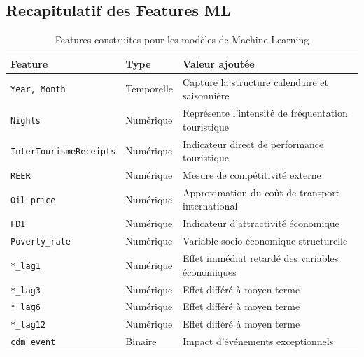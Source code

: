 \documentclass[12pt,a4paper]{report}
\begin{document}
\begin{itemize}[leftmargin=1.5em]
\subsection{Recapitulatif des Features ML}


\begin{table}[H]
\centering
\small
\renewcommand{\arraystretch}{1.4}
\begin{tabular}{p{4.2cm}p{2.8cm}p{6cm}}
\toprule
\textbf{Feature} & \textbf{Type} & \textbf{Valeur ajoutée} \\
\midrule

\texttt{Year, Month} 
& Temporelle 
& Capture la structure calendaire et saisonnière \\

\texttt{Nights} 
& Numérique 
& Représente l’intensité de fréquentation touristique \\

\texttt{InterTourismeReceipts} 
& Numérique 
& Indicateur direct de performance touristique \\

\texttt{REER} 
& Numérique 
& Mesure de compétitivité externe \\

\texttt{Oil\_price} 
& Numérique 
& Approximation du coût de transport international \\

\texttt{FDI} 
& Numérique 
& Indicateur d’attractivité économique \\

\texttt{Poverty\_rate} 
& Numérique 
& Variable socio-économique structurelle \\


\texttt{*\_lag1} 
& Numérique 
& Effet immédiat retardé des variables économiques \\

\texttt{*\_lag3} 
& Numérique 
& Effet différé à moyen terme \\

\texttt{*\_lag6} 
& Numérique 
& Effet différé à moyen terme \\

\texttt{*\_lag12} 
& Numérique 
& Effet différé à moyen terme \\

\texttt{cdm\_event} 
& Binaire 
& Impact d’événements exceptionnels \\

\bottomrule
\end{tabular}
\caption{Features construites pour les modèles de Machine Learning}
\label{tab:features_ml}
\end{table}


\end{itemize}
\end{document}
